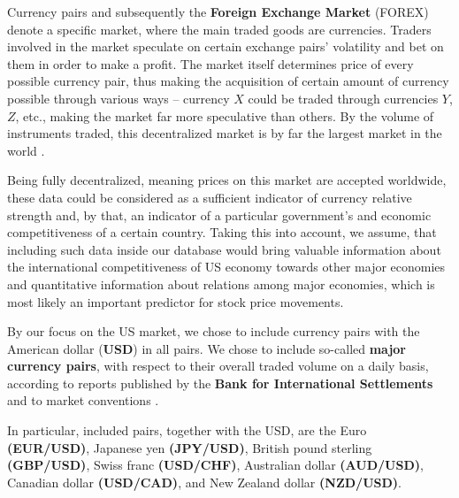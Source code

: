 Currency pairs and subsequently the \textbf{Foreign Exchange Market} (FOREX) denote a specific market, where the main traded goods are currencies. Traders involved in the market speculate 
on certain exchange pairs' volatility and bet on them in order to make a profit. The market itself determines
price of every possible currency pair, thus making the acquisition of certain amount of currency possible through various ways – currency $X$ could be
traded through currencies $Y$, $Z$, etc., making the market far more speculative than others. By the volume of instruments traded, this decentralized 
market is by far the largest market in the world \cite{forex1}.
\par
Being fully decentralized, meaning prices on this market are accepted worldwide, these data could be considered as a sufficient
indicator of currency relative strength and, by that, an indicator of a particular government's and economic competitiveness of a certain country. Taking this into account,
we assume, that including such data inside our database would bring valuable information about the international competitiveness of US economy towards other major economies 
and quantitative information about relations among major economies, which is most likely an important predictor for stock price movements.
\par
By our focus on the US market, we chose to include currency pairs with the American dollar (\textbf{USD}) in all pairs. We chose to include so-called \textbf{major currency pairs},
with respect to their overall traded volume on a daily basis, according to reports published by the \textbf{Bank for International Settlements} and to market conventions \cite{bis_report, forex1}.
\par
In particular, included pairs, together with the USD, are the Euro \textbf{(EUR/USD)}, Japanese yen \textbf{(JPY/USD)}, British pound sterling \textbf{(GBP/USD)}, Swiss franc \textbf{(USD/CHF)}, Australian dollar \textbf{(AUD/USD)}, Canadian dollar \textbf{(USD/CAD)}, and New Zealand dollar \textbf{(NZD/USD)}.

